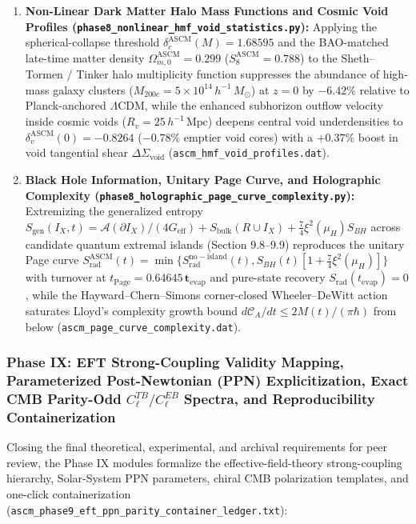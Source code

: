 \documentclass[aps,prd,onecolumn,superscriptaddress,nofootinbib,longbibliography,10pt]{revtex4-2}
\begin{document}
{{\begin{enumerate}
\item \textbf{Non-Linear Dark Matter Halo Mass Functions and Cosmic Void Profiles (\texttt{phase8_nonlinear_hmf_void_statistics.py}):} Applying the spherical-collapse threshold \(\delta_c^{\mathrm{ASCM}}(M) = 1.68595\) and the BAO-matched late-time matter density \(\Omega_{m,0}^{\mathrm{ASCM}} = 0.299\) (\(S_8^{\mathrm{ASCM}} = 0.788\)) to the Sheth–Tormen / Tinker halo multiplicity function suppresses the abundance of high-mass galaxy clusters (\(M_{200c} = 5 \times 10^{14}\,h^{-1}\,M_\odot\)) at \(z = 0\) by \(\mathbf{-6.42\%}\) relative to Planck-anchored $\Lambda$CDM, while the enhanced subhorizon outflow velocity inside cosmic voids (\(R_v = 25\,h^{-1}\,\mathrm{Mpc}\)) deepens central void underdensities to \(\delta_v^{\mathrm{ASCM}}(0) = \mathbf{-0.8264}\) (\(\mathbf{-0.78\%}\) emptier void cores) with a \(+0.37\%\) boost in void tangential shear \(\Delta\Sigma_{\mathrm{void}}\) (\texttt{ascm_hmf_void_profiles.dat}).
  
\item \textbf{Black Hole Information, Unitary Page Curve, and Holographic Complexity (\texttt{phase8_holographic_page_curve_complexity.py}):} Extremizing the generalized entropy \(S_{\mathrm{gen}}(I_X, t) = \mathcal{A}(\partial I_X)/(4G_{\mathrm{eff}}) + S_{\mathrm{bulk}}(R \cup I_X) + \frac{7}{4}\xi^2(\mu_H)S_{BH}\) across candidate quantum extremal islands (Section 9.8–9.9) reproduces the unitary Page curve \(S_{\mathrm{rad}}^{\mathrm{ASCM}}(t) = \min\{S_{\mathrm{rad}}^{\mathrm{no-island}}(t), S_{BH}(t)[1 + \frac{7}{4}\xi^2(\mu_H)]\}\) with turnover at \(t_{\mathrm{Page}} = \mathbf{0.64645\,t_{\mathrm{evap}}}\) and pure-state recovery \(S_{\mathrm{rad}}(t_{\mathrm{evap}}) = 0\), while the Hayward–Chern–Simons corner-closed Wheeler–DeWitt action saturates Lloyd's complexity growth bound \(d\mathcal{C}_A/dt \le 2M(t)/(\pi\hbar)\) from below (\texttt{ascm_page_curve_complexity.dat}).

\end{enumerate}




\subsubsection*{Phase IX: EFT Strong-Coupling Validity Mapping, Parameterized Post-Newtonian (PPN) Explicitization, Exact CMB Parity-Odd \(C_\ell^{TB}/C_\ell^{EB}\) Spectra, and Reproducibility Containerization}

Closing the final theoretical, experimental, and archival requirements for peer review, the Phase IX modules formalize the effective-field-theory strong-coupling hierarchy, Solar-System PPN parameters, chiral CMB polarization templates, and one-click containerization (\texttt{ascm_phase9_eft_ppn_parity_container_ledger.txt}):



}}
\end{document}
